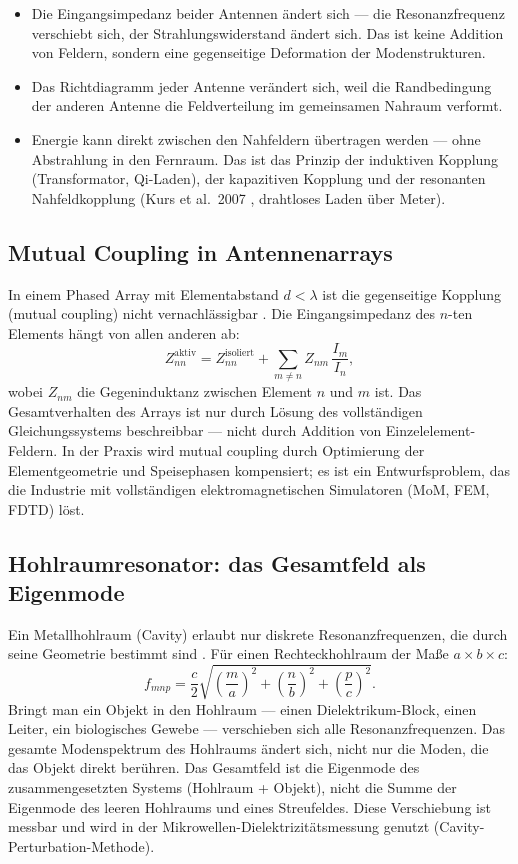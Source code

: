 \begin{itemize}[nosep]
\item Die Eingangsimpedanz beider Antennen ändert sich --- die
  Resonanzfrequenz verschiebt sich, der Strahlungswiderstand ändert
  sich. Das ist keine Addition von Feldern, sondern eine gegenseitige
  Deformation der Modenstrukturen.
\item Das Richtdiagramm jeder Antenne verändert sich, weil die
  Randbedingung der anderen Antenne die Feldverteilung im gemeinsamen
  Nahraum verformt.
\item Energie kann direkt zwischen den Nahfeldern übertragen werden
  --- ohne Abstrahlung in den Fernraum. Das ist das Prinzip der
  induktiven Kopplung (Transformator, Qi-Laden), der kapazitiven
  Kopplung und der resonanten Nahfeldkopplung (Kurs et al.\ 2007 \cite{Kurs2007},
  drahtloses Laden über Meter).
\end{itemize}

\subsection*{Mutual Coupling in Antennenarrays}

In einem Phased Array mit Elementabstand $d < \lambda$ ist die gegenseitige
Kopplung (mutual coupling) nicht vernachlässigbar \cite{Mailloux2017,Pozar2012}. Die Eingangsimpedanz
des $n$-ten Elements hängt von allen anderen ab:
\[
  Z_{nn}^{\mathrm{aktiv}} = Z_{nn}^{\mathrm{isoliert}}
  + \sum_{m \neq n} Z_{nm}\,\frac{I_m}{I_n},
\]
wobei $Z_{nm}$ die Gegeninduktanz zwischen Element $n$ und $m$ ist.
Das Gesamtverhalten des Arrays ist nur durch Lösung des vollständigen
Gleichungssystems beschreibbar --- nicht durch Addition von
Einzelelement-Feldern. In der Praxis wird mutual coupling durch
Optimierung der Elementgeometrie und Speisephasen kompensiert; es
ist ein Entwurfsproblem, das die Industrie mit vollständigen
elektromagnetischen Simulatoren (MoM, FEM, FDTD) löst.

\subsection*{Hohlraumresonator: das Gesamtfeld als Eigenmode}

Ein Metallhohlraum (Cavity) erlaubt nur diskrete Resonanzfrequenzen,
die durch seine Geometrie bestimmt sind \cite{Pozar2012,Griffiths1999}. Für einen Rechteckhohlraum
der Maße $a \times b \times c$:
\[
  f_{mnp} = \frac{c}{2}\sqrt{\left(\frac{m}{a}\right)^2
    + \left(\frac{n}{b}\right)^2 + \left(\frac{p}{c}\right)^2}.
\]
Bringt man ein Objekt in den Hohlraum --- einen Dielektrikum-Block,
einen Leiter, ein biologisches Gewebe --- verschieben sich alle
Resonanzfrequenzen. Das gesamte Modenspektrum des Hohlraums ändert
sich, nicht nur die Moden, die das Objekt direkt berühren. Das
Gesamtfeld ist die Eigenmode des zusammengesetzten Systems
(Hohlraum + Objekt), nicht die Summe der Eigenmode des leeren
Hohlraums und eines Streufeldes. Diese Verschiebung ist messbar
und wird in der Mikrowellen-Dielektrizitätsmessung genutzt
(Cavity-Perturbation-Methode).

